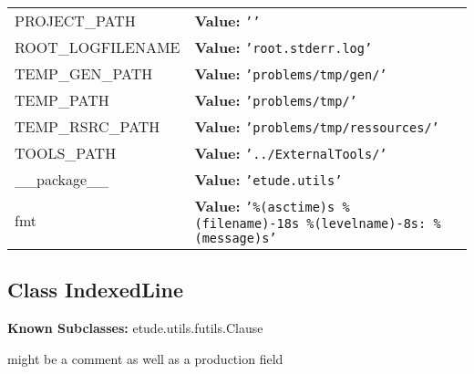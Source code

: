 \begin{longtable}{|p{\varnamewidth}|p{\vardescrwidth}|l}
\cline{1-2}
\raggedright P\-R\-O\-J\-E\-C\-T\-\_\-P\-A\-T\-H\- & \raggedright \textbf{Value:} 
{\tt \texttt{'}\texttt{}\texttt{'}}&\\
\cline{1-2}
\raggedright R\-O\-O\-T\-\_\-L\-O\-G\-F\-I\-L\-E\-N\-A\-M\-E\- & \raggedright \textbf{Value:} 
{\tt \texttt{'}\texttt{root.stderr.log}\texttt{'}}&\\
\cline{1-2}
\raggedright T\-E\-M\-P\-\_\-G\-E\-N\-\_\-P\-A\-T\-H\- & \raggedright \textbf{Value:} 
{\tt \texttt{'}\texttt{problems/tmp/gen/}\texttt{'}}&\\
\cline{1-2}
\raggedright T\-E\-M\-P\-\_\-P\-A\-T\-H\- & \raggedright \textbf{Value:} 
{\tt \texttt{'}\texttt{problems/tmp/}\texttt{'}}&\\
\cline{1-2}
\raggedright T\-E\-M\-P\-\_\-R\-S\-R\-C\-\_\-P\-A\-T\-H\- & \raggedright \textbf{Value:} 
{\tt \texttt{'}\texttt{problems/tmp/ressources/}\texttt{'}}&\\
\cline{1-2}
\raggedright T\-O\-O\-L\-S\-\_\-P\-A\-T\-H\- & \raggedright \textbf{Value:} 
{\tt \texttt{'}\texttt{../ExternalTools/}\texttt{'}}&\\
\cline{1-2}
\raggedright \_\-\_\-p\-a\-c\-k\-a\-g\-e\-\_\-\_\- & \raggedright \textbf{Value:} 
{\tt \texttt{'}\texttt{etude.utils}\texttt{'}}&\\
\cline{1-2}
\raggedright f\-m\-t\- & \raggedright \textbf{Value:} 
{\tt \texttt{'}\texttt{\%(asctime)s \%(filename)-18s \%(levelname)-8s: \%(message)s}\texttt{'}}&\\
\cline{1-2}
\end{longtable}



\subsection{Class IndexedLine}

    \label{etude:utils:futils:IndexedLine}
\textbf{Known Subclasses:} etude.utils.futils.Clause

might be a comment as well as a production field



